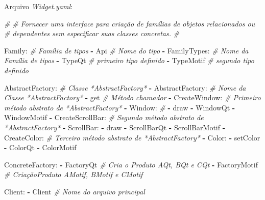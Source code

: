\documentclass[]{article}
\newenvironment{Shaded}{}{}
\newcommand{\KeywordTok}[1]{\textcolor[rgb]{0.00,0.44,0.13}{\textbf{{#1}}}}
\newcommand{\CommentTok}[1]{\textcolor[rgb]{0.38,0.63,0.69}{\textit{{#1}}}}
\newcommand{\FunctionTok}[1]{\textcolor[rgb]{0.02,0.16,0.49}{{#1}}}
\newcommand{\NormalTok}[1]{{#1}}
\begin{document}
\clearpage
Arquivo \emph{Widget.yaml}:

\begin{Shaded}
\begin{Highlighting}[]
\CommentTok{#}
\CommentTok{# Fornecer uma interface para criação de famílias de objetos relacionados ou}
\CommentTok{# dependentes sem especificar suas classes concretas.}
\CommentTok{#}

\FunctionTok{Family:}                      \CommentTok{# Família de tipos}
\KeywordTok{-} \NormalTok{Api                        }\CommentTok{# Nome do tipo}
\KeywordTok{-} \FunctionTok{FamilyTypes:}               \CommentTok{# Nome da Família de tipos}
    \KeywordTok{-} \NormalTok{TypeQt                 }\CommentTok{# primeiro tipo definido}
    \KeywordTok{-} \NormalTok{TypeMotif              }\CommentTok{# segundo tipo definido}

\FunctionTok{AbstractFactory:}             \CommentTok{# Classe *AbstractFactory* }
\KeywordTok{-} \FunctionTok{AbstractFactory:}           \CommentTok{# Nome da Classe *AbstractFactory*}
    \KeywordTok{-} \NormalTok{get                    }\CommentTok{# Método chamador}
    \KeywordTok{-} \FunctionTok{CreateWindow:}          \CommentTok{# Primeiro método abstrato de *AbstractFactory*}
        \KeywordTok{-} \FunctionTok{Window:}            \CommentTok{#}
            \KeywordTok{-} \NormalTok{draw}
            \KeywordTok{-} \NormalTok{WindowQt}
            \KeywordTok{-} \NormalTok{WindowMotif}
    \KeywordTok{-} \FunctionTok{CreateScrollBar:}       \CommentTok{# Segundo método abstrato de *AbstractFactory*}
        \KeywordTok{-} \FunctionTok{ScrollBar:}
            \KeywordTok{-} \NormalTok{draw}
            \KeywordTok{-} \NormalTok{ScrollBarQt}
            \KeywordTok{-} \NormalTok{ScrollBarMotif}
    \KeywordTok{-} \FunctionTok{CreateColor:}           \CommentTok{# Terceiro método abstrato de *AbstractFactory*}
        \KeywordTok{-} \FunctionTok{Color:}
            \KeywordTok{-} \NormalTok{setColor}
            \KeywordTok{-} \NormalTok{ColorQt}
            \KeywordTok{-} \NormalTok{ColorMotif}

\FunctionTok{ConcreteFactory:}
\KeywordTok{-} \NormalTok{FactoryQt                  }\CommentTok{# Cria o Produto AQt, BQt e CQt}
\KeywordTok{-} \NormalTok{FactoryMotif               }\CommentTok{# CriaçãoProduto AMotif, BMotif e CMotif}

\FunctionTok{Client:}
\KeywordTok{-} \NormalTok{Client                     }\CommentTok{# Nome do arquivo principal}
\end{Highlighting}
\end{Shaded}

\clearpage
\end{document}
